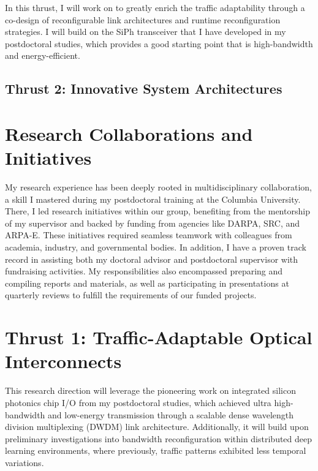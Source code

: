 In this thrust, I will work on to greatly enrich the traffic adaptability through a co-design of reconfigurable link architectures and runtime reconfiguration strategies. I will build on the SiPh transceiver that I have developed in my postdoctoral studies, which provides a good starting point that is high-bandwidth and energy-efficient.


\subsection{Thrust 2: Innovative System Architectures}


\section{Research Collaborations and Initiatives}

My research experience has been deeply rooted in multidisciplinary collaboration, a skill I mastered during my postdoctoral training at the Columbia University. There, I led research initiatives within our group, benefiting from the mentorship of my supervisor and backed by funding from agencies like DARPA, SRC, and ARPA-E. These initiatives required seamless teamwork with colleagues from academia, industry, and governmental bodies. In addition, I have a proven track record in assisting both my doctoral advisor and postdoctoral supervisor with fundraising activities. My responsibilities also encompassed preparing and compiling reports and materials, as well as participating in presentations at quarterly reviews to fulfill the requirements of our funded projects.

\section{Thrust 1: Traffic-Adaptable Optical Interconnects}



This research direction will leverage the pioneering work on integrated silicon photonics chip I/O from my postdoctoral studies\cite{wangScalableArchitectureSubpJ2023}, which achieved ultra high-bandwidth and low-energy transmission through a scalable dense wavelength division multiplexing (DWDM) link architecture. Additionally, it will build upon preliminary investigations into bandwidth reconfiguration within distributed deep learning environments, where previously, traffic patterns exhibited less temporal variations\cite{brianJOCN}.

